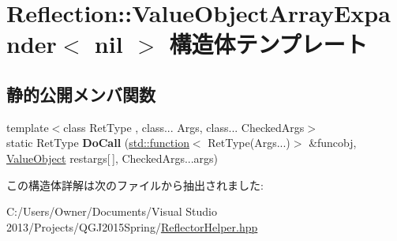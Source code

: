 \hypertarget{struct_reflection_1_1_value_object_array_expander_3_01nil_01_4}{}\section{Reflection\+:\+:Value\+Object\+Array\+Expander$<$ nil $>$ 構造体テンプレート}
\label{struct_reflection_1_1_value_object_array_expander_3_01nil_01_4}
\subsection*{静的公開メンバ関数}
\begin{DoxyCompactItemize}
\item 
{\footnotesize template$<$class Ret\+Type , class... Args, class... Checked\+Args$>$ }\\static Ret\+Type {\bfseries Do\+Call} (\hyperlink{classstd_1_1function}{std\+::function}$<$ Ret\+Type(Args...)$>$ \&funcobj, \hyperlink{struct_reflection_1_1_value_object}{Value\+Object} restargs\mbox{[}$\,$\mbox{]}, Checked\+Args...\+args)\hypertarget{struct_reflection_1_1_value_object_array_expander_3_01nil_01_4_a778e4e90a682de330bc37c772ab5a741}{}\label{struct_reflection_1_1_value_object_array_expander_3_01nil_01_4_a778e4e90a682de330bc37c772ab5a741}

\end{DoxyCompactItemize}


この構造体詳解は次のファイルから抽出されました\+:\begin{DoxyCompactItemize}
\item 
C\+:/\+Users/\+Owner/\+Documents/\+Visual Studio 2013/\+Projects/\+Q\+G\+J2015\+Spring/\hyperlink{_reflector_helper_8hpp}{Reflector\+Helper.\+hpp}\end{DoxyCompactItemize}
